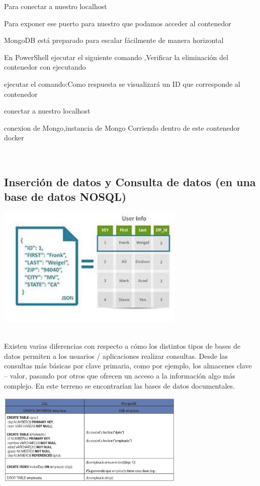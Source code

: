 \documentclass[twoside,onecolumn]{article}
\begin{document}
\begin{flushright}
\begin{itemize}
Para conectar  a nuestro localhost 

Para exponer ese puerto para nuestro que podamos  acceder al contenedor



 MongoDB está preparado para escalar fácilmente de manera horizontal

 En PowerShell ejecutar el siguiente comando ,Verificar la eliminación del contenedor con ejecutando


 ejecutar el comando:Como respuesta se visualizará un ID que corresponde al contenedor


 conectar  a nuestro localhost 

 conexion de Mongo,instancia de Mongo Corriendo dentro de este contenedor docker 


\textbf{}\\
\subsection{Inserción de datos y Consulta de datos (en una base de datos NOSQL)}
\begin{center}
		\includegraphics[width=9cm]{./Imagenes/6}
		\end{center}	
\textbf{}\\
Existen varias diferencias con respecto a cómo los distintos tipos de bases de datos permiten a los usuarios / aplicaciones realizar consultas. Desde las consultas más básicas por clave primaria, como por ejemplo, los almacenes clave – valor, pasando por otros que ofrecen un acceso a la información algo más complejo. En este terreno se encontrarían las bases de datos documentales.
\begin{center}
		\includegraphics[width=9cm]{./Imagenes/1}

\end{center}
\end{itemize}
\end{flushright}
\end{document}
